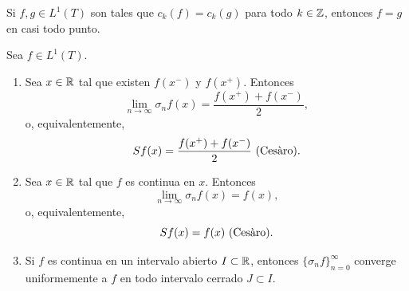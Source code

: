 \documentclass[a4paper, 11pt, oneside]{report}
\begin{document}
\begin{corollary}\label{cor:4.3.6}
  Si $f,g \in L^1(T)$ son tales que $c_k(f) = c_k(g)$ para todo $k \in \Z$, entonces $f = g$ en casi todo punto.
\end{corollary}

\begin{theorem}\label{teo:4.3.7}
  Sea $f \in L^1(T)$.
  \begin{enumerate}
    \item Sea $x \in \R$ tal que existen $f(x^-)$ y $f(x^+)$. Entonces
    \[\lim_{n \to \infty} \sigma_nf(x) = \frac{f(x^+)+f(x^-)}{2},\]
    o, equivalentemente,
    \[Sf(x) = \frac{f(x^+)+f(x^-)}{2} \cesaro.\]
    \item Sea $x \in \R$ tal que $f$ es continua en $x$. Entonces
    \[\lim_{n \to \infty} \sigma_nf(x) = f(x),\]
        o, equivalentemente,
    \[Sf(x) = f(x) \cesaro.\]
    \item Si $f$ es continua en un intervalo abierto $I \subset \R$, entonces $\{\sigma_nf\}_{n=0}^\infty$ converge uniformemente a $f$ en todo intervalo cerrado $J \subset I$.
  \end{enumerate}
\end{theorem}
\end{document}
